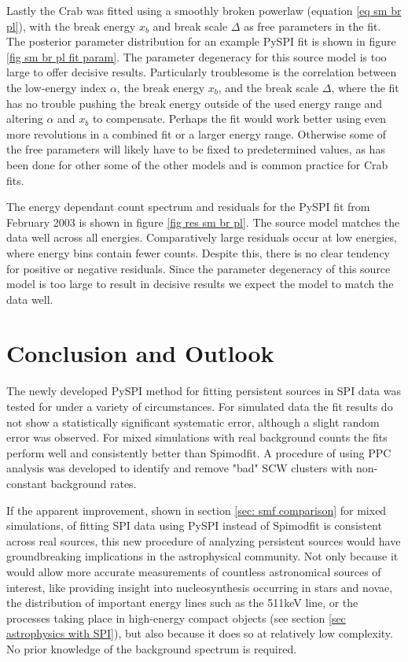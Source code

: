 \documentclass{report}
\begin{document}
Lastly the Crab was fitted using a smoothly broken powerlaw (equation \ref{eq sm br pl}), with the break energy $x_b$ and break scale $\Delta$ as free parameters in the fit. The posterior parameter distribution for an example PySPI fit is shown in figure \ref{fig sm br pl fit param}. The parameter degeneracy for this source model is too large to offer decisive results. Particularly troublesome is the correlation between the low-energy index $\alpha$, the break energy $x_b$, and the break scale $\Delta$, where the fit has no trouble pushing the break energy outside of the used energy range and altering $\alpha$ and $x_b$ to compensate. Perhaps the fit would work better using even more revolutions in a combined fit or a larger energy range. Otherwise some of the free parameters will likely have to be fixed to predetermined values, as has been done for other some of the other models and is common practice for Crab fits. 

The energy dependant count spectrum and residuals for the PySPI fit from February 2003 is shown in figure \ref{fig res sm br pl}. The source model matches the data well across all energies. Comparatively large residuals occur at low energies, where energy bins contain fewer counts. Despite this, there is no clear tendency for positive or negative residuals. Since the parameter degeneracy of this source model is too large to result in decisive results we expect the model to match the data well. 

\chapter{Conclusion and Outlook}
The newly developed PySPI method for fitting persistent sources in SPI data was tested for under a variety of circumstances. For simulated data the fit results do not show a statistically significant systematic error, although a slight random error was observed. For mixed simulations with real background counts the fits perform well and consistently better than Spimodfit. A procedure of using PPC analysis was developed to identify and remove "bad" SCW clusters with non-constant background rates. 

If the apparent improvement, shown in section \ref{sec: smf comparison} for mixed simulations, of fitting SPI data using PySPI instead of Spimodfit is consistent across real sources, this new procedure of analyzing persistent sources would have groundbreaking implications in the astrophysical community. Not only because it would allow more accurate measurements of countless astronomical sources of interest, like providing insight into nucleosynthesis occurring in stars and novae, the distribution of important energy lines such as the 511keV line, or the processes taking place in high-energy compact objects (see section \ref{sec astrophysics with SPI}), but also because it does so at relatively low complexity. No prior knowledge of the background spectrum is required. 
\end{document}
